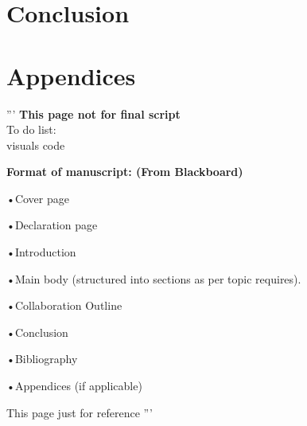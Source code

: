 \documentclass{article}
\begin{document}
\section{Conclusion}
\clearpage



\clearpage
\section{Appendices}
\clearpage
'''
\textbf{This page not for final script}\\
To do list:\\
visuals code




\textbf{Format of manuscript: (From Blackboard)}

•Cover page

•Declaration page

•Introduction

•Main body (structured into sections as per topic requires).

•Collaboration Outline

•Conclusion 

•Bibliography

•Appendices (if applicable)

This page just for reference
'''
\end{document}
